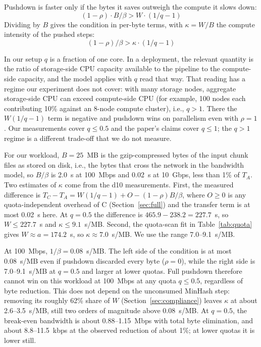 \documentclass[11pt]{article}
\begin{document}
Pushdown is faster only if the bytes it saves outweigh the compute it slows down:
\begin{equation}
(1 - \rho) \cdot B/\beta > W \cdot (1/q - 1)
\end{equation}
Dividing by $B$ gives the condition in per-byte terms, with $\kappa = W/B$ the compute intensity of the pushed steps:
\begin{equation}
(1 - \rho)/\beta > \kappa \cdot (1/q - 1)
\end{equation}

In our setup $q$ is a fraction of one core. In a deployment, the relevant quantity is the ratio of storage-side CPU capacity available to the pipeline to the compute-side capacity, and the model applies with $q$ read that way. That reading has a regime our experiment does not cover: with many storage nodes, aggregate storage-side CPU can exceed compute-side CPU (for example, 100 nodes each contributing 10\% against an 8-node compute cluster), i.e., $q > 1$. There the $W(1/q - 1)$ term is negative and pushdown wins on parallelism even with $\rho = 1$. Our measurements cover $q \le 0.5$ and the paper's claims cover $q \le 1$; the $q > 1$ regime is a different trade-off that we do not measure.

For our workload, $B = 25$~MB is the gzip-compressed bytes of the input chunk files as stored on disk, i.e., the bytes that cross the network in the bandwidth model, so $B/\beta$ is 2.0~s at 100~Mbps and 0.02~s at 10~Gbps, less than 1\% of $T_A$. Two estimates of $\kappa$ come from the d10 measurements. First, the measured difference is $T_C - T_A = W(1/q - 1) + O - (1 - \rho)B/\beta$, where $O \ge 0$ is any quota-independent overhead of C (Section~\ref{sec:full}) and the transfer term is at most 0.02~s here. At $q = 0.5$ the difference is $465.9 - 238.2 = 227.7$~s, so $W \le 227.7$~s and $\kappa \le 9.1$~s/MB. Second, the quota-scan fit in Table~\ref{tab:quota} gives $W \approx a = 174.2$~s, so $\kappa \approx 7.0$~s/MB. We use the range 7.0--9.1~s/MB.

At 100~Mbps, $1/\beta = 0.08$~s/MB. The left side of the condition is at most 0.08~s/MB even if pushdown discarded every byte ($\rho = 0$), while the right side is 7.0--9.1~s/MB at $q = 0.5$ and larger at lower quotas. Full pushdown therefore cannot win on this workload at 100~Mbps at any quota $q \le 0.5$, regardless of byte reduction. This does not depend on the unconsumed MinHash step: removing its roughly 62\% share of $W$ (Section~\ref{sec:compliance}) leaves $\kappa$ at about 2.6--3.5~s/MB, still two orders of magnitude above 0.08~s/MB. At $q = 0.5$, the break-even bandwidth is about 0.88--1.15~Mbps with total byte elimination, and about 8.8--11.5~kbps at the observed reduction of about 1\%; at lower quotas it is lower still.
\end{document}
